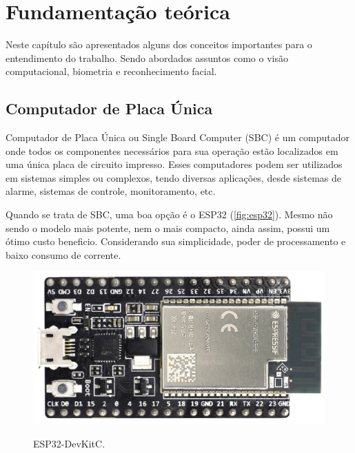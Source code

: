 \chapter{Fundamentação te\'orica}\label{cap:referencialTeorico}

Neste capítulo são apresentados alguns dos conceitos importantes para o entendimento
do trabalho. Sendo abordados assuntos como o visão computacional, biometria e 
reconhecimento facial.

\section{Computador de Placa Única}\label{sec:formatacaoTexto3}

Computador de Placa Única ou Single Board Computer (SBC) é um computador onde todos 
os componentes necessários para sua operação estão localizados em uma única placa de 
circuito impresso. Esses computadores podem ser utilizados em sistemas simples ou complexos, 
tendo diversas aplicações, desde sistemas de alarme, sistemas de controle, 
monitoramento, etc.

Quando se trata de SBC, uma boa opção é o ESP32 (\autoref{fig:esp32}). Mesmo não 
sendo o modelo mais potente, nem o mais compacto, ainda assim, possui um ótimo custo 
beneficio. Considerando sua simplicidade, poder de processamento e baixo consumo 
de corrente.

\begin{figure}[h!]
    \centering
    \caption{ESP32-DevKitC.}
    \includegraphics[scale=0.13]{figuras/esp323.png} 
    \label{fig:esp32}
    \centering
\end{figure}

